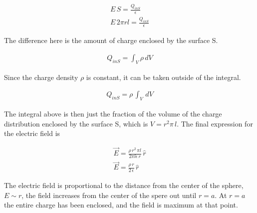 \documentclass{ximera}
\begin{document}
\begin{eqnarray}
E \, S = \frac{Q_{inS}}{\epsilon} \\
 E \, 2 \pi r l = \frac{Q_{inS}}{\epsilon}
\end{eqnarray}

The difference here is the amount of charge enclosed by the surface S.  



\begin{eqnarray}
Q_{inS}=\int_V \rho \, dV
\end{eqnarray}

Since the charge density $\rho$ is constant, it  can be taken outside of the integral.


\begin{eqnarray}
Q_{inS}=\rho \, \int_V \, dV
\end{eqnarray}

The integral above is then just the fraction of the volume of the charge distribution enclosed by the surface S, which is $V=r^2 \pi \, l $. The final expression for the electric field is 


\begin{eqnarray}
 \vec{E}  = \frac{\rho \, r^2 \, \pi  l }{2 \pi  l  \epsilon \, r} \, \hat{r} \\
 \vec{E}  = \frac{\rho \, r}{2  \, \epsilon } \, \hat{r}
\end{eqnarray}

The electric field is proportional to the distance from the center of the sphere, $E\sim r$, the field increases from the center of the spere out until $r=a$. At $r=a$ the entire charge has been enclosed, and the field is maximum at that point.
\end{document}
